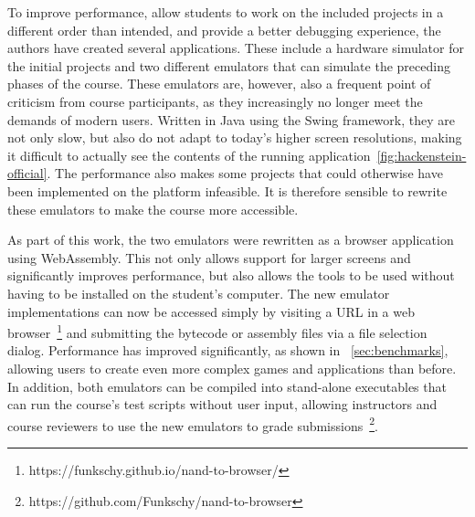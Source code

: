 To improve performance, allow students to work on the included projects in a different order than intended, and provide a better debugging experience, the authors have created several applications.
These include a hardware simulator for the initial projects and two different emulators that can simulate the preceding phases of the course.
These emulators are, however, also a frequent point of criticism from course participants, as they increasingly no longer meet the demands of modern users.
Written in Java using the Swing framework, they are not only slow, but also do not adapt to today's higher screen resolutions, making it difficult to actually see the contents of the running application~\ref{fig:hackenstein-official}.
The performance also makes some projects that could otherwise have been implemented on the platform infeasible.
It is therefore sensible to rewrite these emulators to make the course more accessible.

As part of this work, the two emulators were rewritten as a browser application using WebAssembly. This not only allows support for larger screens and significantly improves performance, but also allows the tools to be used without having to be installed on the student's computer.
The new emulator implementations can now be accessed simply by visiting a URL in a web browser~\footnote{https://funkschy.github.io/nand-to-browser/} and submitting the bytecode or assembly files via a file selection dialog. Performance has improved significantly, as shown in ~\cref{sec:benchmarks}, allowing users to create even more complex games and applications than before.
In addition, both emulators can be compiled into stand-alone executables that can run the course's test scripts without user input, allowing instructors and course reviewers to use the new emulators to grade submissions~\footnote{https://github.com/Funkschy/nand-to-browser}.
